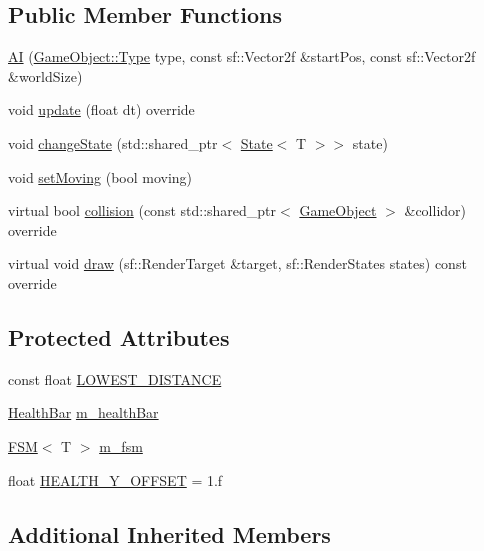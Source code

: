 \subsection*{Public Member Functions}
\begin{DoxyCompactItemize}
\item 
\hyperlink{class_a_i_a0e9856d1f5aa1f0009f9ff2cd51e0598}{AI} (\hyperlink{class_game_object_a4bf9e8f660e6a49f1b802c2aa9dd95af}{Game\+Object\+::\+Type} type, const sf\+::\+Vector2f \&start\+Pos, const sf\+::\+Vector2f \&world\+Size)
\item 
void \hyperlink{class_a_i_a1e1875bffd6f4da9e8333cba89aa3cd7}{update} (float dt) override
\item 
void \hyperlink{class_a_i_ae08cb2117d4352ad462fefa357028a82}{change\+State} (std\+::shared\+\_\+ptr$<$ \hyperlink{class_state}{State}$<$ T $>$$>$ state)
\item 
void \hyperlink{class_a_i_ac705298af197a4e87594ee095bfceb60}{set\+Moving} (bool moving)
\item 
virtual bool \hyperlink{class_a_i_a15f7ffd56bf48c7475f9b50d82b60528}{collision} (const std\+::shared\+\_\+ptr$<$ \hyperlink{class_game_object}{Game\+Object} $>$ \&collidor) override
\item 
virtual void \hyperlink{class_a_i_a8a7423a8612cfd777f3b5eeae4764d50}{draw} (sf\+::\+Render\+Target \&target, sf\+::\+Render\+States states) const override
\end{DoxyCompactItemize}
\subsection*{Protected Attributes}
\begin{DoxyCompactItemize}
\item 
const float \hyperlink{class_a_i_a876a6f7273d86861bfbec7ada91c40b0}{L\+O\+W\+E\+S\+T\+\_\+\+D\+I\+S\+T\+A\+N\+CE}
\item 
\hyperlink{class_health_bar}{Health\+Bar} \hyperlink{class_a_i_aa85c378f07b503e706be6cc150a2bae8}{m\+\_\+health\+Bar}
\item 
\hyperlink{class_f_s_m}{F\+SM}$<$ T $>$ \hyperlink{class_a_i_a3411b59aac349775e44e764125a007dd}{m\+\_\+fsm}
\item 
float \hyperlink{class_a_i_ad32aa749623a2cce0d11ea44eb925602}{H\+E\+A\+L\+T\+H\+\_\+\+Y\+\_\+\+O\+F\+F\+S\+ET} = 1.f
\end{DoxyCompactItemize}
\subsection*{Additional Inherited Members}


